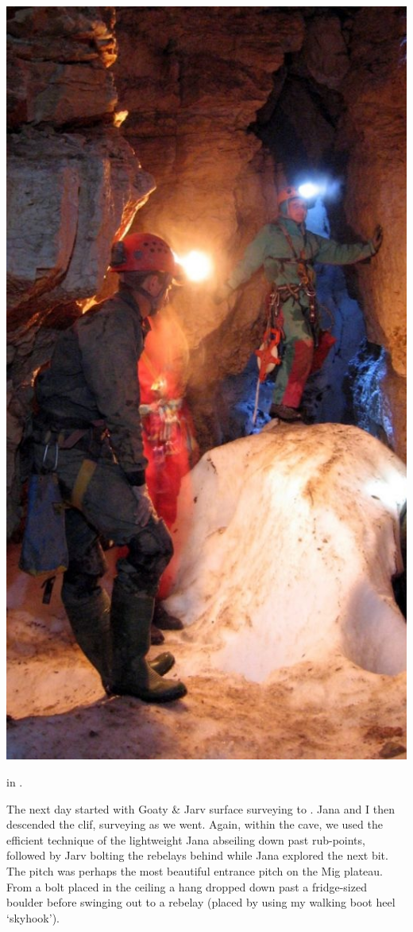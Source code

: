 \begin{marginfigure}
\centering 
  \includegraphics[width=\linewidth]{2007/b9/jarvist frost - planika - acre lane--orig.jpg}
  \caption{ in . }
\end{marginfigure}

The next day started with Goaty \& Jarv surface surveying to . Jana
and I then descended the clif, surveying as we went. Again, within the
cave, we used the efficient technique of the lightweight Jana abseiling
down past rub-points, followed by Jarv bolting the rebelays behind while
Jana explored the next bit. The pitch was perhaps the most beautiful
entrance pitch on the Mig plateau. From a bolt placed in the ceiling a
hang dropped down past a fridge-sized boulder before swinging out to a
rebelay (placed by using my walking boot heel `skyhook'). 

